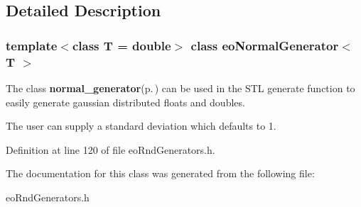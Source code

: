 \subsection{Detailed Description}
\subsubsection*{template$<$class T = double$>$ class eo\-Normal\-Generator$<$ T $>$}

The class {\bf normal\_\-generator}{\rm (p.\,\pageref{classnormal__generator})} can be used in the STL generate function to easily generate gaussian distributed floats and doubles. 

The user can supply a standard deviation which defaults to 1. 



Definition at line 120 of file eo\-Rnd\-Generators.h.

The documentation for this class was generated from the following file:\begin{CompactItemize}
\item 
eo\-Rnd\-Generators.h\end{CompactItemize}
